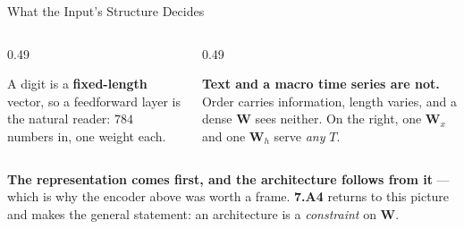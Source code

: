 \begin{frame}{What the Input's Structure Decides}
\begin{columns}[T]
\begin{column}{0.49\textwidth}
\begin{conceptbox}\footnotesize
A digit is a \textbf{fixed-length} vector, so a feedforward layer is the natural reader: $784$ numbers in, one weight each.
\end{conceptbox}
\end{column}
\begin{column}{0.49\textwidth}
\begin{cautionbox}\footnotesize
\textbf{Text and a macro time series are not.} Order carries information, length varies, and a dense $\mathbf{W}$ sees neither. On the right, one $\mathbf{W}_x$ and one $\mathbf{W}_h$ serve \emph{any} $T$.
\end{cautionbox}
\end{column}
\end{columns}
\vspace{1mm}
\begin{takeawaybox}\footnotesize
\textbf{The representation comes first, and the architecture follows from it} --- which is why the encoder above was worth a frame. \textbf{7.A4} returns to this picture and makes the general statement: an architecture is a \emph{constraint} on $\mathbf{W}$.
\end{takeawaybox}
\end{frame}

